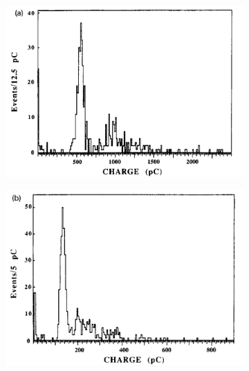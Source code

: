 	\begin{figure}
		\begin{subfigure}{\linewidth}
			\centering
			\includegraphics[width = 0.5\plotwidth]{fig/chapt3/Gas-mix-0-freon.png}
			\caption{\label{fig:FreonCharge:A}}
		\end{subfigure}
		\begin{subfigure}{\linewidth}
			\centering
			\includegraphics[width = 0.5\plotwidth]{fig/chapt3/Gas-mix-4-freon.png}
			\caption{\label{fig:FreonCharge:B}}
		\end{subfigure}
		\begin{subfigure}{\linewidth}
			\centering

\end{subfigure}
\end{figure}
